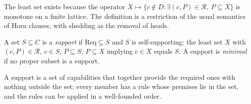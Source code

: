 The least set exists because the operator $X\mapsto\{c\notin D:\exists (c,P)\in\mathcal R,\ P\subseteq X\}$ is monotone on a finite lattice. The definition is a restriction of the usual semantics of Horn clauses, with shedding as the removal of heads.

\begin{definition}[Supports]\label{def:support}
A set $S\subseteq C$ is a \emph{support} if $\mathrm{Req}\subseteq S$ and $S$ is self-supporting: the least set $X$ with $(c,P)\in\mathcal R$, $c\in S$, $P\subseteq S$, $P\subseteq X$ implying $c\in X$ equals $S$. A support is \emph{minimal} if no proper subset is a support.
\end{definition}

A support is a set of capabilities that together provide the required ones with nothing outside the set: every member has a rule whose premises lie in the set, and the rules can be applied in a well-founded order.

